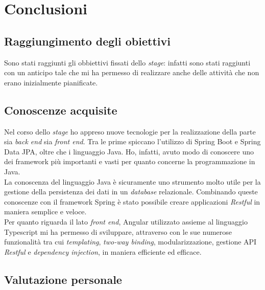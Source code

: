 
\chapter{Conclusioni}
\label{cap:conclusioni}
\section{Raggiungimento degli obiettivi}
Sono stati raggiunti gli obbiettivi fissati dello \textit{stage}: infatti sono stati raggiunti con un anticipo tale che mi ha permesso di realizzare anche delle attività che non erano inizialmente pianificate.




\section{Conoscenze acquisite}
Nel corso dello \textit{stage} ho appreso nuove tecnologie per la realizzazione della parte sia \textit{back end} sia \textit{front end}. Tra le prime spiccano l'utilizzo di Spring Boot e Spring Data JPA, oltre che i linguaggio Java. Ho, infatti, avuto modo di conoscere uno  dei \gls{framework}  più importanti e vasti per quanto concerne la programmazione in Java.\\
La conoscenza del linguaggio Java è sicuramente uno strumento molto utile per la gestione della persistenza dei dati in un \textit{database} relazionale. Combinando queste conoscenze con il \gls{framework} Spring è stato possibile creare applicazioni \textit{Restful} in maniera semplice e veloce.\\
Per quanto riguarda il lato \textit{front end}, Angular utilizzato assieme al linguaggio Typescript mi ha permesso di sviluppare, attraverso con le sue numerose funzionalità tra cui \textit{templating}, \textit{two-way binding}, modularizzazione, gestione \gls{API} \textit{Restful} e \textit{dependency injection}, in maniera efficiente ed efficace.  

\section{Valutazione personale}
